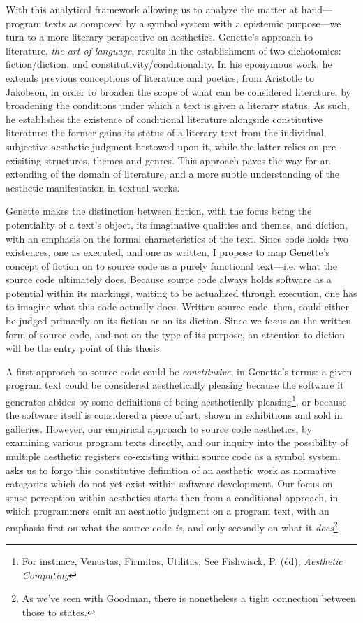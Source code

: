 With this analytical framework allowing us to analyze the matter at hand—program texts as composed by a symbol system with a epistemic purpose—we turn to a more literary perspective on aesthetics. Genette's approach to literature, \emph{the art of language}, results in the establishment of two dichotomies: fiction/diction, and constitutivity/conditionality. In his eponymous work\cite{genette_fiction_1993}, he extends previous conceptions of literature and poetics, from Aristotle to Jakobson, in order to broaden the scope of what can be considered literature, by broadening the conditions under which a text is given a literary status. As such, he establishes the existence of conditional literature alongside constitutive literature: the former gains its status of a literary text from the individual, subjective aesthetic judgment bestowed upon it, while the latter relies on pre-exisiting structures, themes and genres. This approach paves the way for an extending of the domain of literature\cite{gefen_extension_2019}, and a more subtle understanding of the aesthetic manifestation in textual works.

Genette makes the distinction between fiction, with the focus being the potentiality of a text's object, its imaginative qualities and themes, and diction, with an emphasis on the formal characteristics of the text. Since code holds two existences, one as executed, and one as written, I propose to map Genette's concept of fiction on to source code as a purely functional text—i.e. what the source code ultimately does. Because source code always holds software as a potential within its markings, waiting to be actualized through execution, one has to imagine what this code actually does. Written source code, then, could either be judged primarily on its fiction or on its diction. Since we focus on the written form of source code, and not on the type of its purpose, an attention to diction will be the entry point of this thesis.

A first approach to source code could be \emph{constitutive}, in Genette's terms: a given program text could be considered aesthetically pleasing because the software it generates abides by some definitions of being aesthetically pleasing\footnote{For instnace, Venustas, Firmitas, Utilitas; See Fishwisck, P. (éd), \emph{Aesthetic Computing}}, or because the software itself is considered a piece of art, shown in exhibitions and sold in galleries. However, our empirical approach to source code aesthetics, by examining various program texts directly, and our inquiry into the possibility of multiple aesthetic registers co-existing within source code as a symbol system, asks us to forgo this constitutive definition of an aesthetic work as normative categories which do not yet exist within software development. Our focus on sense perception within aesthetics starts then from a conditional approach, in which programmers emit an aesthetic judgment on a program text, with an emphasis first on what the source code \emph{is}, and only secondly on what it \emph{does}\footnote{As we've seen with Goodman, there is nonetheless a tight connection between those to states.}.

